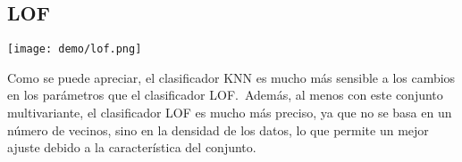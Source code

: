 \subsection{LOF}
\noindent
\begin{minipage}{\linewidth}
	\centering
	\texttt{[image: demo/lof.png]}
	\label{fig:demo32}
\end{minipage}

Como se puede apreciar, el clasificador KNN es mucho más sensible a los cambios en los parámetros que el clasificador
LOF.~Además, al menos con este conjunto multivariante, el clasificador LOF es mucho más preciso, ya que no se basa
en un número de vecinos, sino en la densidad de los datos, lo que permite un mejor ajuste debido a la característica
del conjunto.
